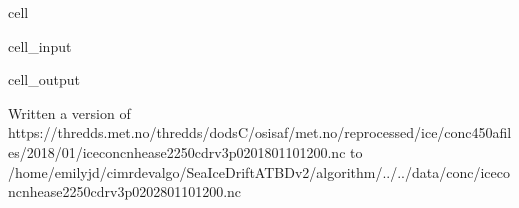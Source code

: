 \documentclass[letterpaper,10pt,english]{jupyterBook}
\begin{document}
\begin{sphinxuseclass}{cell}
\begin{sphinxVerbatimInput}
\begin{sphinxuseclass}{cell_input}
\begin{sphinxVerbatim}[commandchars=\\\{\}]
   
   
     

  

  
\end{sphinxVerbatim}

\end{sphinxuseclass}\end{sphinxVerbatimInput}
\begin{sphinxVerbatimOutput}

\begin{sphinxuseclass}{cell_output}
\begin{sphinxVerbatim}[commandchars=\\\{\}]
Written a version of https://thredds.met.no/thredds/dodsC/osisaf/met.no/reprocessed/ice/conc\PYGZus{}450a\PYGZus{}files/2018/01/ice\PYGZus{}conc\PYGZus{}nh\PYGZus{}ease2\PYGZhy{}250\PYGZus{}cdr\PYGZhy{}v3p0\PYGZus{}201801101200.nc to /home/emilyjd/cimr\PYGZhy{}devalgo/SeaIceDrift\PYGZus{}ATBD\PYGZus{}v2/algorithm/../../data/conc/ice\PYGZus{}conc\PYGZus{}nh\PYGZus{}ease2\PYGZhy{}250\PYGZus{}cdr\PYGZhy{}v3p0\PYGZus{}202801101200.nc
\end{sphinxVerbatim}

\end{sphinxuseclass}\end{sphinxVerbatimOutput}

\end{sphinxuseclass}
\end{document}

